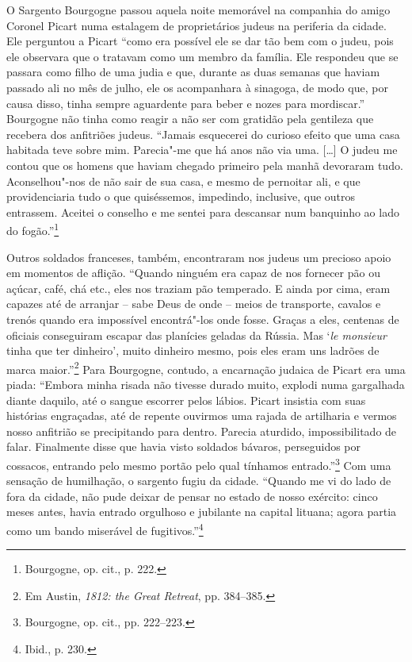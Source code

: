 O Sargento Bourgogne passou aquela noite memorável na companhia do amigo
Coronel Picart numa estalagem de proprietários judeus na periferia da
cidade. Ele perguntou a Picart ``como era possível ele se dar tão bem
com o judeu, pois ele observara que o tratavam como um membro da
família. Ele respondeu que se passara como filho de uma judia e que,
durante as duas semanas que haviam passado ali no mês de julho, ele os
acompanhara à sinagoga, de modo que, por causa disso, tinha sempre
aguardente para beber e nozes para mordiscar.'' Bourgogne não tinha como
reagir a não ser com gratidão pela gentileza que recebera dos anfitriões
judeus. ``Jamais esquecerei do curioso efeito que uma casa habitada teve
sobre mim. Parecia"-me que há anos não via uma. [\ldots{}] O judeu me
contou que os homens que haviam chegado primeiro pela manhã devoraram
tudo. Aconselhou"-nos de não sair de sua casa, e mesmo de pernoitar ali,
e que providenciaria tudo o que quiséssemos, impedindo, inclusive, que
outros entrassem. Aceitei o conselho e me sentei para descansar num
banquinho ao lado do fogão.''\footnote{Bourgogne, op. cit., p. 222.}

Outros soldados franceses, também, encontraram nos judeus um precioso
apoio em momentos de aflição. ``Quando ninguém era capaz de nos fornecer
pão ou açúcar, café, chá etc., eles nos traziam pão temperado. E ainda
por cima, eram capazes até de arranjar -- sabe Deus de onde -- meios de
transporte, cavalos e trenós quando era impossível encontrá"-los onde
fosse. Graças a eles, centenas de oficiais conseguiram escapar das
planícies geladas da Rússia. Mas `\textit{le monsieur} tinha que ter
dinheiro', muito dinheiro mesmo, pois eles eram uns ladrões de marca
maior.''\footnote{Em Austin, \textit{1812: the Great Retreat}, pp. 384--385.} Para Bourgogne, contudo, a encarnação judaica de Picart era uma piada: ``Embora minha risada não tivesse durado muito, explodi numa
gargalhada diante daquilo, até o sangue escorrer pelos lábios. Picart
insistia com suas histórias engraçadas, até de repente ouvirmos uma
rajada de artilharia e vermos nosso anfitrião se precipitando para
dentro. Parecia aturdido, impossibilitado de falar. Finalmente disse que
havia visto soldados bávaros, perseguidos por cossacos, entrando pelo
mesmo portão pelo qual tínhamos entrado.''\footnote{Bourgogne, op. cit., pp. 222--223.} Com uma sensação de humilhação, o sargento fugiu da cidade. ``Quando me vi do lado de fora da cidade, não pude deixar de
pensar no estado de nosso exército: cinco meses antes, havia entrado
orgulhoso e jubilante na capital lituana; agora partia como um bando
miserável de fugitivos.''\footnote{Ibid., p. 230.}

